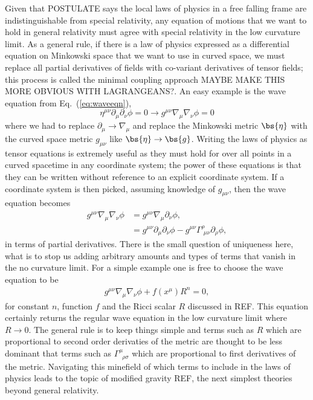 Given that POSTULATE says the local laws of physics in a free falling frame are indistinguishable from special relativity, any equation of motions that we want to hold in general relativity must agree with special relativity in the low curvature limit. As a general rule, if there is a law of physics expressed as a differential equation on Minkowski space that we want to use in curved space, we must replace all partial derivatives of fields with co-variant derivatives of tensor fields; this process is called the minimal coupling approach MAYBE MAKE THIS MORE OBVIOUS WITH LAGRANGEANS?. An easy example is the wave equation from Eq.~(\ref{eq:waveeqn}),
\begin{equation} 
\eta^{\mu\nu}\partial_\mu \partial_\nu \phi=0 \rightarrow g^{\mu\nu}\nabla_\mu \nabla_\nu\phi =0
\end{equation}
where we had to replace $\partial_\mu \rightarrow \nabla_\mu$ and replace the Minkowski metric $\bs{\eta}$ with the curved space metric $g_{\mu\nu}$ like $\bs{\eta}\rightarrow \bs{g}$. Writing the laws of physics as tensor equations is extremely useful as they must hold for over all points in a curved spacetime in any coordinate system; the power of these equations is that they can be written without reference to an explicit coordinate system. If a coordinate system is then picked, assuming knowledge of $g_{\mu\nu}$, then the wave equation becomes
\begin{align}
g^{\mu\nu}\nabla_\mu \nabla_\nu \phi &= g^{\mu\nu}\nabla_\mu \partial_\nu \phi ,\\
&= g^{\mu\nu}\partial_\mu \partial_\nu \phi - g^{\mu\nu}\Gamma^\rho_{\,\,\mu\nu}\partial_\rho \phi,
\end{align}
in terms of partial derivatives. There is the small question of uniqueness here, what is to stop us adding arbitrary amounts and types of terms that vanish in the no curvature limit. For a simple example one is free to choose the wave equation to be
\begin{align}
g^{\mu\nu}\nabla_\mu\nabla_\nu \phi + f(x^\mu) R^n = 0,
\end{align}
for constant $n$, function $f$ and the Ricci scalar $R$ discussed in REF. This equation certainly returns the regular wave equation in the low curvature limit where $R\rightarrow 0$. The general rule is to keep things simple and terms such as $R$ which are proportional to second order derivaties of the metric are thought to be less dominant that terms such as $\Gamma^\mu_{\,\,\,\rho\sigma}$ which are proportional to first derivatives of the metric. Navigating this minefield of which terms to include in the laws of physics leads to the topic of modified gravity REF, the next simplest theories beyond general relativity.


